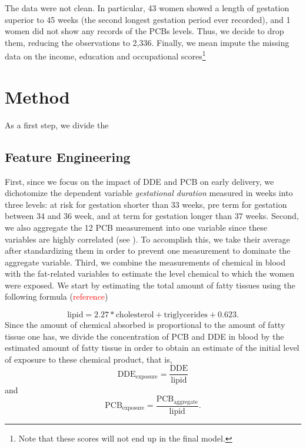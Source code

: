 \documentclass[wcp]{jmlr}%
\newcommand\todo[1]{\textcolor{red}{#1}}
\begin{document}
 The data were not clean. In particular, 43 women showed a length of gestation superior to 45 weeks (the second longest gestation period ever recorded), and 1 women did not show any records of the PCBs levels. Thus, we decide to drop them, reducing the observations to 2,336. Finally, we mean impute the missing data on the income, education and occupational scores\footnote{Note that these scores will not end up in the final model.}


\section{Method}
\label{sec:method}
As a first step, we divide the 
\subsection{Feature Engineering}
First, since we focus on the impact of DDE and PCB on early delivery, we dichotomize the dependent variable \textit{gestational duration} measured in weeks into three levels: at risk for gestation shorter than $33$ weeks, pre term for gestation between $34$ and $36$ week, and at term for gestation longer than $37$ weeks. 
Second, we also aggregate the 12 PCB measurement into one variable since these variables are highly correlated (see ). To accomplish this, we take their average after standardizing them in order to prevent one measurement to dominate the aggregate variable. 
Third, we combine the measurements of chemical in blood with the fat-related variables to estimate the level chemical to which the women were exposed. We start by estimating the total amount of fatty tissues using the following formula (\todo{reference})

\begin{equation}
\label{eq:fat}
\text{lipid} = 2.27 * \text{cholesterol} + \text{triglycerides} + 0.623.
\end{equation}
Since the amount of chemical absorbed is proportional to the amount of fatty tissue one has, we divide the concentration of PCB and DDE in blood by the estimated amount of fatty tissue in order to obtain an estimate of the initial level of exposure to these chemical product, that is,
\begin{equation}
\label{eq:exp_dde}
\text{DDE}_{\text{exposure}} = \dfrac{\text{DDE}}{\text{lipid}}
\end{equation}
and 
\begin{equation}
\label{eq:exp_pcb}
\text{PCB}_{\text{exposure}} = \dfrac{\text{PCB}_\text{aggregate}}{\text{lipid}}.
\end{equation}
\end{document}
